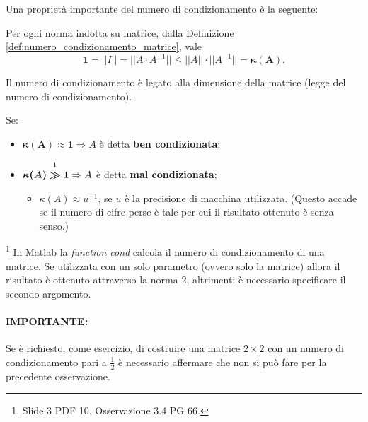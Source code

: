 
Una proprietà importante del numero di condizionamento è la seguente:
\begin{remark}
    Per ogni norma indotta su matrice, dalla Definizione \ref{def:numero_condizionamento_matrice}, vale
    \begin{equation*}
        \boldsymbol 1 = ||I||=||A\cdot A^{-1}||\boldsymbol\leq ||A||\cdot||A^{-1}||=\boldsymbol{\kappa(A)}.
    \end{equation*}
\end{remark}

Il numero di condizionamento è legato alla dimensione della matrice (legge del numero di condizionamento).

Se:
\begin{itemize}
    \item $\boldsymbol{\kappa(A)\approx 1}\Rightarrow A$ è detta \textbf{ben condizionata};
    \item $\boldsymbol{\kappa(A)}\overset{\footnotemark}{\boldsymbol\gg}\boldsymbol 1 \Rightarrow A$ è detta \textbf{mal condizionata};
    \begin{itemize}
        \item $\kappa(A)\approx u^{-1}$, se $u$ è la precisione di macchina utilizzata. (Questo accade se il numero di cifre perse è tale per cui il risultato ottenuto è senza senso.)
    \end{itemize}
\end{itemize}

\begin{remark}\footnote{Slide 3 PDF 10, Osservazione 3.4 PG 66.}
    In Matlab la \textit{function cond} calcola il numero di condizionamento di una matrice. Se utilizzata con un solo parametro (ovvero solo la matrice) allora il risultato è ottenuto attraverso la norma 2, altrimenti è necessario specificare il secondo argomento.
\end{remark}

\paragraph{IMPORTANTE:} Se è richiesto, come esercizio, di costruire  una matrice $2\times 2$ con un numero di condizionamento pari a $\frac{1}{2}$ è necessario affermare che non si può fare per la precedente osservazione.

